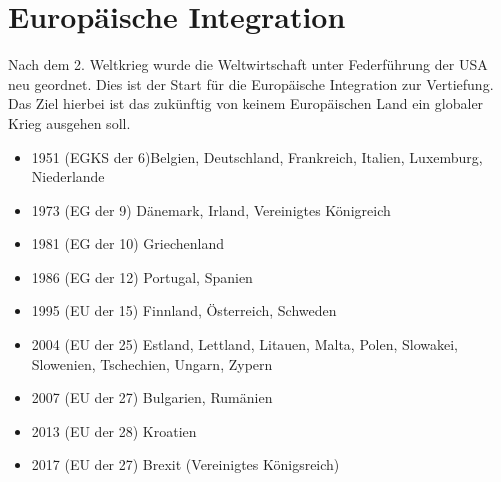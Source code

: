 \section{Europäische Integration}
Nach dem 2. Weltkrieg wurde die Weltwirtschaft unter Federführung der USA neu geordnet. Dies ist der Start für die Europäische Integration zur Vertiefung. Das Ziel hierbei ist das zukünftig von keinem Europäischen Land ein globaler Krieg ausgehen soll. 
\begin{itemize}
	\item 1951 (EGKS der 6)Belgien, Deutschland, Frankreich, Italien, Luxemburg, Niederlande
	\item 1973 (EG der 9) Dänemark, Irland, Vereinigtes Königreich
	\item 1981 (EG der 10) Griechenland
	\item 1986 (EG der 12) Portugal, Spanien
	\item 1995 (EU der 15) Finnland, Österreich, Schweden
	\item 2004 (EU der 25) Estland, Lettland, Litauen, Malta, Polen, Slowakei, Slowenien, Tschechien, Ungarn, Zypern
	\item 2007 (EU der 27) Bulgarien, Rumänien
	\item 2013 (EU der 28) Kroatien
	\item 2017 (EU der 27) Brexit (Vereinigtes Königsreich)
\end{itemize}